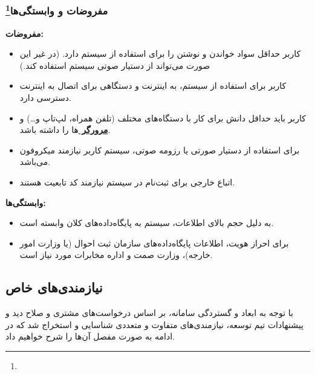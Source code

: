 \documentclass[12pt]{article}
\begin{document}
	\subsubsection{مفروضات و وابستگی‌ها\footnote{}}
	\textbf{مفروضات:}
	\begin{itemize}
		\item
		کاربر حداقل سواد خواندن و نوشتن را برای استفاده از سیستم دارد. (در غیر این صورت می‌تواند از دستیار صوتی سیستم استفاده کند.)
		\item
		کاربر برای استفاده از سیستم، به اینترنت و دستگاهی برای اتصال به اینترنت دسترسی دارد.
		\item
		کاربر باید حداقل دانش برای کار با دستگاه‌های مختلف (تلفن همراه، لپ‌تاپ و…) و \textbf{\hyperref[ref:browser]{مرورگر }}ها را داشته باشد.
		\item
		برای استفاده از دستیار صورتی یا رزومه صوتی، سیستم کاربر نیازمند میکروفون می‌باشد.
		\item
		اتباع خارجی برای ثبت‌نام در سیستم نیازمند کد تابعیت هستند.
	\end{itemize}
	\textbf{وابستگی‌ها:}
	\begin{itemize}
		\item
		به دلیل حجم بالای اطلاعات، سیستم به پایگاه‌داده‌های کلان وابسته است.
		\item
		برای احراز هویت، اطلاعات پایگاه‌داده‌های سازمان ثبت احوال (یا وزارت امور خارجه)، وزارت صمت و اداره مخابرات مورد‌ نیاز است.
	\end{itemize}

	\newpage
	\subsection{نیازمندی‌های خاص}
	با توجه به ابعاد و گستردگی سامانه، بر اساس درخواست‌های مشتری و صلاح دید و پیشنهادات تیم توسعه، نیازمندی‌های متفاوت و متعددی شناسایی و استخراج شد که در ادامه به صورت مفصل آن‌ها را شرح خواهیم داد.
\end{document}
